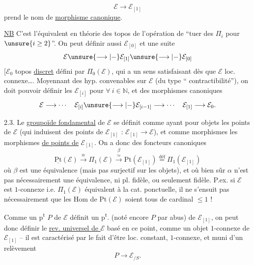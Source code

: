 \[
\mathcal E\longrightarrow\mathcal E_{[1]}
\]
prend le nom de \uline{morphisme canonique}.

\uline{NB} C'est l'équivalent en théorie des topos de l'opération de ``tuer des $\Pi_i$ pour $\unsure{i\geq 2}$''. On peut définir aussi   $\mathcal E_{[0]}$ et une suite
\[
\mathcal E\unsure{\longrightarrow|-}\mathcal E_{[1]}\unsure{\longrightarrow|-}\mathcal E_{[0]}
\]
[$\mathcal E_0$  topos \uline{discret} défini par $\Pi_0(\mathcal E)$, qui a un sens satisfaisant dès que $\mathcal E$ loc. connexe\dots\unsure{]|!}. Moyennant des hyp. convenables sur $\mathcal E$ (du type `` contractibilité''), on doit pouvoir définir les $\mathcal E_{[i]}$ pour $\forall\ i\in\mathbb N$, et des morphismes canoniques
\[
\mathcal E\longrightarrow\cdots\quad
\mathcal E_{[i]}\unsure{\longrightarrow|-}\mathcal E_{[i-1]}\longrightarrow\cdots\quad
\mathcal E_{[1]}\longrightarrow\mathcal E_0.
\]



2.3. Le \uline{groupoïde fondamental} de $\mathcal E$ se définit comme ayant pour objets les points de $\mathcal E$ (qui induisent des points de $\mathcal E_{[1]}$  : $\mathcal E_{[1]}\longrightarrow\mathcal E$), et comme morphismes les  morphismes \uline{de points de} $\mathcal E_{[1]}$. On a donc des foncteurs canoniques
\[
\underline{\mathrm{Pt}}(\mathcal E)
\xrightarrow{\alpha}\Pi_1(\mathcal E)
\overset{\beta}{\overset{\simeq}{\longrightarrow}}
\mathrm{Pt}(\mathcal E_{[1]})
\overset{\text{déf}}{=}\Pi_1(\mathcal E_{[1]})
\]
où $\beta$ est une équivalence (mais pas surjectif sur les objets), et où bien sûr $\alpha$ n'est pas nécessairement une équivalence, ni  pl. fidèle, ou seulement fidèle. P.ex. si $\mathcal E$ est $1$-connexe i.e. $\Pi_1(\mathcal E)$ équivalent à la cat. ponctuelle, il ne s'ensuit pas nécessairement que les Hom de $\mathrm{Pt}(\mathcal E)$ soient tous de cardinal $\leq 1$ !



Comme un p\textsuperscript{t} $P$ de $\mathcal E$ définit un p\textsuperscript{t}. (noté encore $P$ par abus) de $\mathcal E_{[1]}$, on peut donc définir le \uline{rev. universel de $\mathcal E$} basé en ce point, comme un objet  $1$-connexe de $\mathcal E_{[1]}$ -- il est caractérisé  par le fait d'être loc. constant, $1$-connexe, et muni d'un relèvement
\[
P\longrightarrow\mathcal E_{/S}.
\]

